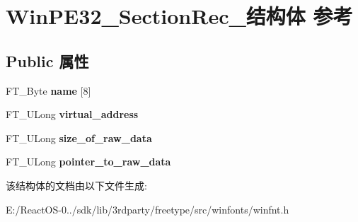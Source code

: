 \hypertarget{struct_win_p_e32___section_rec__}{}\section{Win\+P\+E32\+\_\+\+Section\+Rec\+\_\+结构体 参考}
\label{struct_win_p_e32___section_rec__}
\subsection*{Public 属性}
\begin{DoxyCompactItemize}
\item 
\mbox{\label{struct_win_p_e32___section_rec___ad47502ee4359569e58c352d0dbcf1712}} 
F\+T\+\_\+\+Byte {\bfseries name} \mbox{[}8\mbox{]}
\item 
\mbox{\label{struct_win_p_e32___section_rec___a01e47fce84a3295e082bc5aed4762559}} 
F\+T\+\_\+\+U\+Long {\bfseries virtual\+\_\+address}
\item 
\mbox{\label{struct_win_p_e32___section_rec___a47d5e15bdbe2d8e43f96f67c68e96662}} 
F\+T\+\_\+\+U\+Long {\bfseries size\+\_\+of\+\_\+raw\+\_\+data}
\item 
\mbox{\label{struct_win_p_e32___section_rec___aa9b7b13155129ada998736789c5ef4ac}} 
F\+T\+\_\+\+U\+Long {\bfseries pointer\+\_\+to\+\_\+raw\+\_\+data}
\end{DoxyCompactItemize}


该结构体的文档由以下文件生成\+:\begin{DoxyCompactItemize}
\item 
E\+:/\+React\+O\+S-\/0../sdk/lib/3rdparty/freetype/src/winfonts/winfnt.\+h\end{DoxyCompactItemize}
